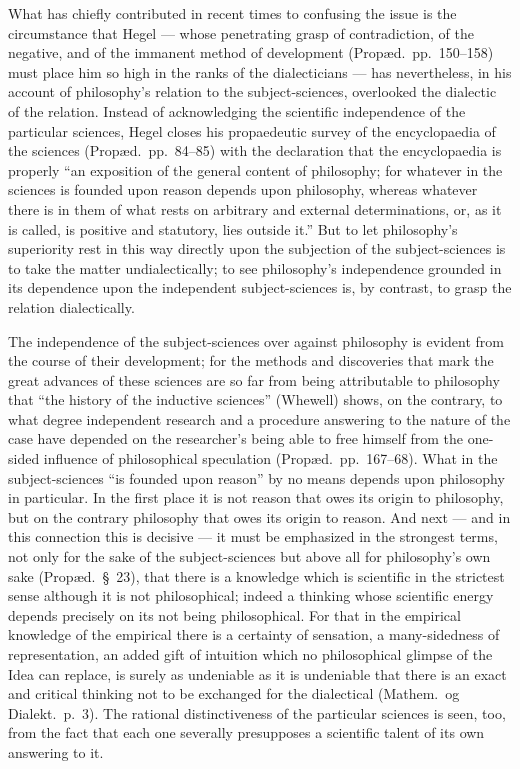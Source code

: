 \documentclass[12pt,a4paper]{book}
\begin{document}
What has chiefly contributed in recent times to confusing the issue is the
circumstance that Hegel --- whose penetrating grasp of contradiction, of the
negative, and of the immanent method of development (Propæd.\ pp.~150--158)
must place him so high in the ranks of the dialecticians --- has nevertheless,
in his account of philosophy's relation to the subject-sciences, overlooked the
dialectic of the relation. Instead of acknowledging the scientific independence
of the particular sciences, Hegel closes his propaedeutic survey of the
encyclopaedia of the sciences (Propæd.\ pp.~84--85) with the declaration that
the encyclopaedia is properly ``an exposition of the general content of
philosophy; for whatever in the sciences
is founded upon reason depends upon philosophy, whereas whatever there is in
them of what rests on arbitrary and external determinations, or, as it is
called, is positive and statutory, lies outside it.'' But to let philosophy's
superiority rest in this way directly upon the subjection of the
subject-sciences is to take the matter undialectically; to see philosophy's
independence grounded in its dependence upon the independent subject-sciences
is, by contrast, to grasp the relation dialectically.

The independence of the subject-sciences over against philosophy is evident
from the course of their development; for the methods and discoveries that mark
the great advances of these sciences are so far from being attributable to
philosophy that ``the history of the inductive sciences'' (Whewell) shows, on
the contrary, to what degree independent research and a procedure answering to
the nature of the case have depended on the researcher's being able to free
himself from the one-sided influence of philosophical speculation (Propæd.\
pp.~167--68). What in the subject-sciences ``is founded upon reason'' by no
means depends upon philosophy in particular. In the first place it is not
reason that owes its origin to philosophy, but on the contrary philosophy that
owes its origin to reason. And next --- and in this connection this is
decisive --- it must be emphasized in the strongest terms, not only for the
sake of the subject-sciences but above all for philosophy's own sake (Propæd.\
§~23), that there is a knowledge which is scientific in the strictest sense
although it is not philosophical; indeed a thinking whose scientific energy
depends precisely on its not being philosophical. For that in the empirical
knowledge of the empirical there is a certainty of sensation, a many-sidedness
of representation, an added gift of intuition which no philosophical glimpse of
the Idea can replace, is surely as undeniable as it is undeniable that there is
an exact and critical thinking not to be exchanged for the dialectical
(Mathem.\ og Dialekt.\ p.~3). The rational
distinctiveness of the particular sciences is seen, too, from the fact that
each one severally presupposes a scientific talent of its own answering to it.
\end{document}
